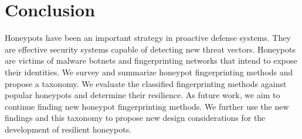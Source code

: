 \section{Conclusion}
\label{sec:conc}

Honeypots have been an important strategy in proactive defense systems. They are effective security systems capable of detecting new threat vectors. Honeypots are victims of malware botnets and fingerprinting networks that intend to expose their identities.  We survey and summarize honeypot fingerprinting methods and propose a taxonomy. We evaluate the classified fingerprinting methods against popular honeypots and determine their resilience. As future work, we aim to continue finding new honeypot fingerprinting methods. We further use the new findings and this taxonomy to propose new design considerations for the development of resilient honeypots. 
